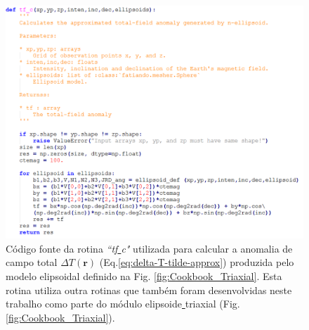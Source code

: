 \begin{figure}[hbt!]
	\centering \includegraphics[width=16 cm,height=17 cm]{figures/func_triaxial}
	\caption[Código fonte da rotina \textit{``tf\underline{ }c"} utilizada para calcular a anomalia de campo total $\Delta T (\mathbf{r})$ (Eq.\ref{eq:delta-T-tilde-approx}) produzida pelo modelo elipsoidal definido na Fig. \ref{fig:Cookbook_Triaxial}. Esta rotina utiliza outra rotinas que também foram desenvolvidas neste trabalho como parte do módulo elipsoide\underline{ }triaxial (Fig. \ref{fig:Cookbook_Triaxial}).]{Código fonte da rotina \textit{``tf\underline{ }c"} utilizada para calcular a anomalia de campo total $\Delta T (\mathbf{r})$ (Eq.\ref{eq:delta-T-tilde-approx}) produzida pelo modelo elipsoidal definido na Fig. \ref{fig:Cookbook_Triaxial}. Esta rotina utiliza outra rotinas que também foram desenvolvidas neste trabalho como parte do módulo elipsoide\underline{ }triaxial (Fig. \ref{fig:Cookbook_Triaxial}).}
	\label{fig:func_triaxial}
\end{figure}


